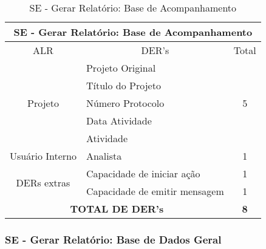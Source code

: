     \begin{table}[!h]
    \centering
    \caption{SE - Gerar Relatório: Base de Acompanhamento}
    \label{se_base_acompanhamento}
    \begin{tabular}{|c|l|c|}
    \hline
    \multicolumn{3}{|c|}{SE - Gerar Relatório: Base de Acompanhamento}            \\ \hline
    ALR                      & \multicolumn{1}{c|}{DER's}    & Total              \\ \hline
    \multirow{5}{*}{Projeto} & Projeto Original              & \multirow{5}{*}{5} \\ \cline{2-2}
			    & Título do Projeto             &                    \\ \cline{2-2}
			    & Número Protocolo              &                    \\ \cline{2-2}
			    & Data Atividade                &                    \\ \cline{2-2}
			    & Atividade                     &                    \\ \hline
    Usuário Interno                 & Analista                      & 1                  \\ \hline
    \multirow{2}{*}{DERs extras}              & Capacidade de iniciar ação    & 1                  \\ \cline{2-2}
      & Capacidade de emitir mensagem & 1                  \\ \hline
    \multicolumn{2}{|c|}{\textbf{TOTAL DE DER's}}          & \textbf{8}         \\ \hline
    \end{tabular}
    \end{table}
    
    \vfill
    \pagebreak
    
  \subsubsection{SE - Gerar Relatório: Base de Dados Geral}
   
